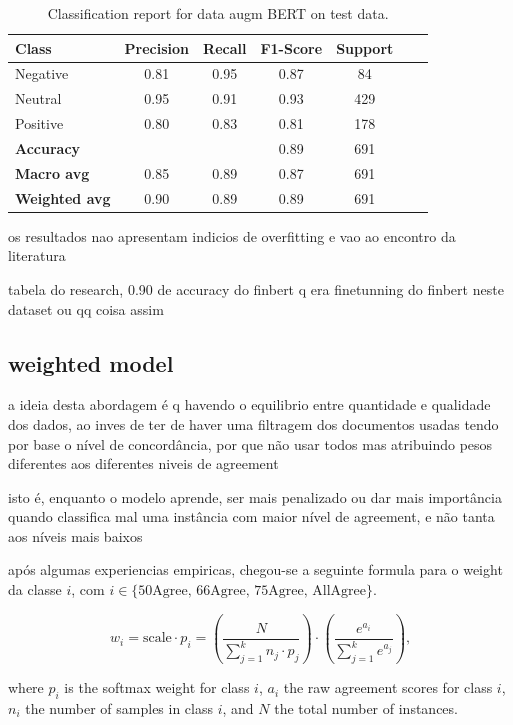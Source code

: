 \documentclass[conference]{IEEEtran}
\begin{document}
\begin{table}[H]
\centering
\caption{Classification report for data augm BERT on test data.}
\label{cr_augmbert_test}
\begin{tabular}{lcccccc}
\toprule
\textbf{Class} & \textbf{Precision} & \textbf{Recall} & \textbf{F1-Score} & \textbf{Support} \\
\midrule
Negative & 0.81 & 0.95 & 0.87 & 84 \\
Neutral & 0.95 & 0.91 & 0.93 & 429 \\
Positive & 0.80 & 0.83 & 0.81 & 178 \\
\midrule
\textbf{Accuracy} &  &  & 0.89 & 691 \\
\textbf{Macro avg} & 0.85 & 0.89 & 0.87 & 691 \\
\textbf{Weighted avg} & 0.90 & 0.89 & 0.89 & 691 \\
\bottomrule
\end{tabular}
\end{table}

os resultados nao apresentam indicios de overfitting e vao ao encontro da literatura

tabela do research, 0.90 de accuracy do finbert q era finetunning do finbert neste dataset ou qq coisa assim



\subsection{weighted model}

a ideia desta abordagem é q havendo o equilibrio entre quantidade e qualidade dos dados, ao inves de ter de haver uma filtragem dos documentos usadas tendo por base o nível de concordância, por que não usar todos mas atribuindo pesos diferentes aos diferentes niveis de agreement

isto é, enquanto o modelo aprende, ser mais penalizado ou dar mais importância quando classifica mal uma instância com maior nível de agreement, e não tanta aos níveis mais baixos

após algumas experiencias empiricas, chegou-se a seguinte formula para o weight da classe $i$, com $i \in \{\text{50Agree, 66Agree, 75Agree, AllAgree}\}$.

$$
w_i = \text{scale} \cdot p_i = \left( \frac{N}{\sum_{j=1}^k n_j \cdot p_j} \right) \cdot  \left( \frac{e^{a_i}}{\sum_{j=1}^k e^{a_j}} \right) \text{,}
$$

\noindent where $p_i$ is the softmax weight for class $i$, $a_i$ the raw agreement scores for class $i$, $n_i$ the number of samples in class $i$, and $N$ the total number of instances.
\end{document}
